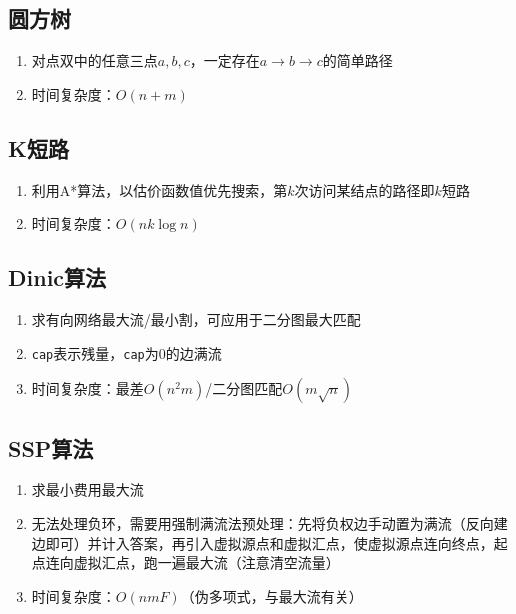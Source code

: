 \documentclass[twocolumn,a4,8pt]{article}  %
\begin{document}
	 	\subsection{圆方树}
			\noindent\begin{enumerate}
				\item 对点双中的任意三点$a,b,c$，一定存在$a\rightarrow b\rightarrow c$的简单路径
				\item 时间复杂度：$O(n+m)$
			\end{enumerate}
	 	 	
	 	 	
		\subsection{K短路}
			\noindent\begin{enumerate}
				\item 利用A*算法，以估价函数值优先搜索，第$k$次访问某结点的路径即$k$短路
				\item 时间复杂度：$O(nk\log n)$
			\end{enumerate}
	 	 	
	 	 	
		\subsection{Dinic算法}
			\noindent\begin{enumerate}
				\item 求有向网络最大流/最小割，可应用于二分图最大匹配
				\item \texttt{cap}表示残量，\texttt{cap}为$0$的边满流
				\item 时间复杂度：最差$O(n^2m)$/二分图匹配$O(m\sqrt{n})$
			\end{enumerate}
	 	 	
	 	 	
		\subsection{SSP算法}
			\noindent\begin{enumerate}
				\item 求最小费用最大流
				\item 无法处理负环，需要用强制满流法预处理：先将负权边手动置为满流（反向建边即可）并计入答案，再引入虚拟源点和虚拟汇点，使虚拟源点连向终点，起点连向虚拟汇点，跑一遍最大流（注意清空流量）
				\item 时间复杂度：$O(nmF)$（伪多项式，与最大流有关）
			\end{enumerate}
	 	 	
	 	 	
\end{document}
